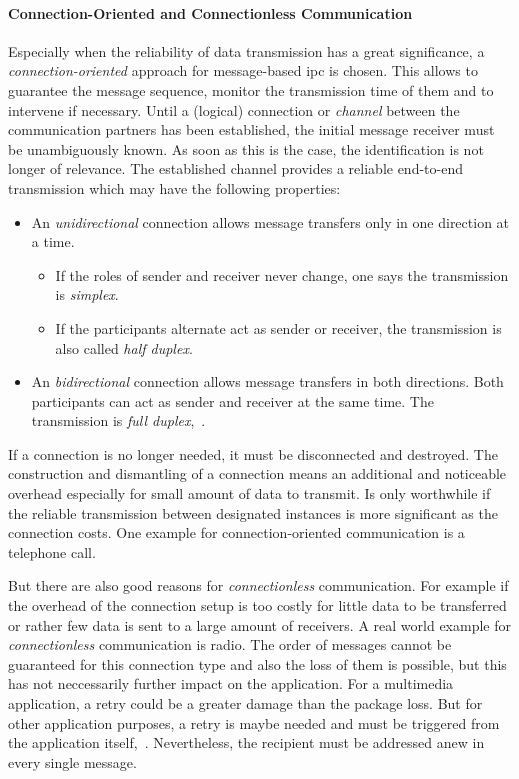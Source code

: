 \paragraph{Connection-Oriented and Connectionless Communication}
Especially when the reliability of data transmission has a great significance, a \textit{connection-oriented} approach for message-based \ac{ipc} is chosen.
This allows to guarantee the message sequence, monitor the transmission time of them and to intervene if necessary\cite{glatz2015betriebssysteme}.
Until a (logical) connection or \textit{channel} between the communication partners has been established, the initial message receiver must be unambiguously known.
As soon as this is the case, the identification is not longer of relevance.
The established channel provides a reliable end-to-end transmission which may have the following properties:
%
\begin{itemize}
    \item An \textit{unidirectional} connection allows message transfers only in one direction at a time. 
        \begin{itemize}
            \item If the roles of sender and receiver never change, one says the transmission is \textit{simplex}.
            \item If the participants alternate act as sender or receiver, the transmission is also called \textit{half duplex}.
        \end{itemize}
    \item An \textit{bidirectional} connection allows message transfers in both directions. Both participants can act as sender and receiver at the same time. The transmission is \textit{full duplex}\cite{brause2017betriebssysteme},~\cite{glatz2015betriebssysteme}.
\end{itemize}
%
If a connection is no longer needed, it must be disconnected and destroyed.
The construction and dismantling of a connection means an additional and noticeable overhead especially for small amount of data to transmit.
Is only worthwhile if the reliable transmission between designated instances is more significant as the connection costs\cite{glatz2015betriebssysteme}.
One example for connection-oriented communication is a telephone call.

But there are also good reasons for \textit{connectionless} communication.
For example if the overhead of the connection setup is too costly for little data to be transferred or rather few data is sent to a large amount of receivers.
A real world example for \textit{connectionless} communication is radio.
The order of messages cannot be guaranteed for this connection type and also the loss of them is possible, but this has not neccessarily further impact on the application.
For a multimedia application, a retry could be a greater damage than the package loss.
But for other application purposes, a retry is maybe needed and must be triggered from the application itself\cite{glatz2015betriebssysteme},~\cite{brause2017betriebssysteme}.
Nevertheless, the recipient must be addressed anew in every single message.

